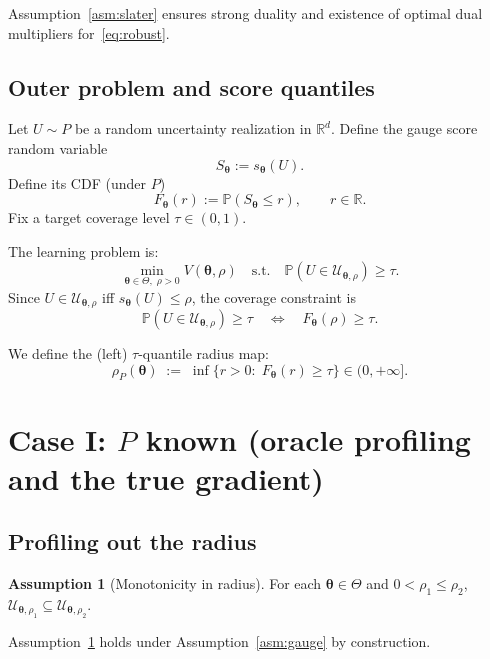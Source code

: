 \documentclass[11pt]{article}
\newcommand{\R}{\mathbb{R}}
\newcommand{\Prob}{\mathbb{P}}
\newcommand{\cU}{\mathcal{U}}
\newcommand{\btheta}{\bm{\theta}}
\theoremstyle{plain}
\theoremstyle{definition}
\newtheorem{assumption}[theorem]{Assumption}
\begin{document}
Assumption~\ref{asm:slater} ensures strong duality and existence of optimal dual multipliers for~\eqref{eq:robust}.

\subsection{Outer problem and score quantiles}

Let $U\sim P$ be a random uncertainty realization in $\R^d$.
Define the gauge score random variable
\[
S_{\btheta} := s_{\btheta}(U).
\]
Define its CDF (under $P$)
\[
F_{\btheta}(r) := \Prob(S_{\btheta}\le r),\qquad r\in \R.
\]
Fix a target coverage level $\tau\in(0,1)$.

The learning problem is:
\begin{equation}\label{eq:bilevel}
\boxed{
\min_{\btheta\in \Theta,\;\rho>0} V(\btheta,\rho)
\quad\text{s.t.}\quad
\Prob(U\in \cU_{\btheta,\rho})\ge \tau.
}
\end{equation}
Since $U\in \cU_{\btheta,\rho}$ iff $s_{\btheta}(U)\le \rho$, the coverage constraint is
\begin{equation}\label{eq:coverage}
\Prob(U\in \cU_{\btheta,\rho})\ge \tau
\quad\Longleftrightarrow\quad
F_{\btheta}(\rho)\ge \tau.
\end{equation}

We define the (left) $\tau$-quantile radius map:
\begin{equation}\label{eq:rhoP}
\rho_P(\btheta)\;:=\;\inf\{r>0:\;F_{\btheta}(r)\ge \tau\}\in (0,+\infty].
\end{equation}

\section{Case I: $P$ known (oracle profiling and the true gradient)}

\subsection{Profiling out the radius}

\begin{assumption}[Monotonicity in radius]\label{asm:monotone}
For each $\btheta\in\Theta$ and $0<\rho_1\le \rho_2$, $\cU_{\btheta,\rho_1}\subseteq \cU_{\btheta,\rho_2}$.
\end{assumption}

Assumption~\ref{asm:monotone} holds under Assumption~\ref{asm:gauge} by construction.
\end{document}
